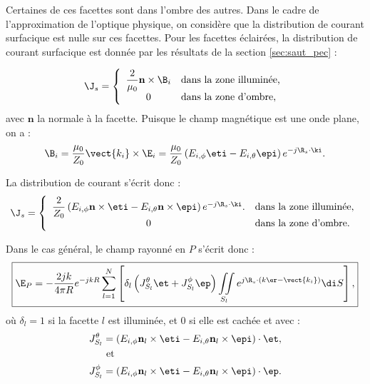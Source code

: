 Certaines de ces facettes sont dans l'ombre des autres. Dans le cadre de l'approximation de l'optique physique, on considère que la distribution de courant surfacique est nulle sur ces facettes. Pour les facettes éclairées, la distribution de courant surfacique est donnée par les résultats de la section \ref{sec:saut_pec} :

\begin{equation}
	\J_s = \left\{
	\begin{array}{cl}
		\dfrac{2}{\mu_0}\mathbf n\times\B_i & \text{dans la zone illuminée,}\\
		0 & \text{dans la zone d'ombre,}
	\end{array}\right.
\end{equation}
%
avec $\mathbf{n}$ la normale à la facette.
Puisque le champ magnétique est une onde plane, on a :
\begin{equation}
	\B_i = \frac{\mu_0}{Z_0}\vect{k_i}\times\E_i = \frac{\mu_0}{Z_0}\left(E_{i,\phi}\eti-E_{i,\theta}\epi\right)e^{-j\R_s\cdot\ki}.
\end{equation}

La distribution de courant s'écrit donc :
\begin{equation}
	\J_s = \left\{
	\begin{array}{cl}
		\dfrac{2}{Z_0}\left(E_{i,\phi}\mathbf{n}\times\eti-E_{i,\theta}\mathbf{n}\times\epi
		\right)e^{-j\R_s\cdot\ki}. & \text{dans la zone illuminée,}\\
		0 & \text{dans la zone d'ombre.}
	\end{array}\right.
\end{equation}

Dans le cas général, le champ rayonné en $P$ s'écrit donc :
\begin{equation}
	\label{eq:rayon_bistat}
	\boxed{
	\E_P = - \frac{2jk}{4\pi R}e^{-jkR}\sum_{l=1}^N\left[\delta_l\left(J_{S_l}^\theta\et+J_{S_l}^\phi\ep\right)\iint\limits_{S_l}e^{j\R_s\cdot(k\er-\vect{k_i})}\di S\right],
	}
\end{equation}
%
où $\delta_l = 1$ si la facette $l$ est illuminée, et 0 si elle est cachée et avec :
\begin{align*}
	J_{S_l}^\theta &= \left(E_{i,\phi}\mathbf n_l\times\eti-E_{i,\theta}\mathbf n_l\times\epi\right)\cdot\et,
	\\ &\text{    et} \\
	J_{S_l}^\phi &= \left(E_{i,\phi}\mathbf n_l\times\eti-E_{i,\theta}\mathbf n_l \times\epi\right)\cdot\ep.
\end{align*}

